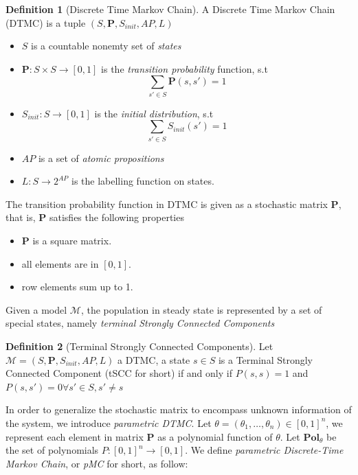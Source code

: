 \documentclass[12pt]{article}
\theoremstyle{definition}
\newtheorem{definition}{Definition}[section]
\begin{document}
\begin{definition}[Discrete Time Markov Chain]
  A Discrete Time Markov Chain (DTMC) is a tuple $(S,\mathbf{P}, S_{init}, AP,
  L)$
  \begin{itemize}
  \item $S$ is a countable nonemty set of \textit{states}
  \item $\mathbf{P}:S\times S \rightarrow [0,1]$ is the \textit{transition probability}
    function, s.t $$\sum_{s'\in S}\mathbf{P}(s, s') = 1$$
  \item $S_{init}: S \rightarrow [0,1]$ is the \textit{initial distribution},
    s.t  $$\sum_{s'\in S}S_{init}(s') = 1$$
  \item $AP$ is a set of \textit{atomic propositions}
  \item $L: S \rightarrow 2^{AP}$ is the labelling function on states.
  \end{itemize}
\end{definition}

The transition probability function in DTMC is given as a stochastic matrix $\mathbf{P}$,
that is, $\mathbf{P}$ satisfies the following properties
\begin{itemize}
\item $\mathbf{P}$ is a square matrix.
\item all elements are in $[0,1]$.
\item row elements sum up to 1.
\end{itemize}

Given a model $\mathcal{M}$, the population in steady state is represented by a
set of special states, namely \textit{terminal Strongly Connected Components}
\begin{definition}[Terminal Strongly Connected Components]
  Let $\mathcal{M}= (S,\mathbf{P}, S_{init}, AP, L)$ a DTMC, a state $s\in
  S$ is a Terminal Strongly Connected Component (tSCC for short) if and only if
  $P(s, s) = 1$ and $P(s, s') = 0 \forall s' \in S, s' \neq s$
\end{definition}

In order to generalize the stochastic matrix to encompass unknown information of
the system, we introduce \textit{parametric DTMC}. Let $\theta =
(\theta_1,\ldots,\theta_n) \in [0,1]^n$, we represent each element in matrix
$\mathbf{P}$ as a polynomial function of $\theta$. Let $\mathbf{Pol}_\theta$ be the
set of polynomials $P: [0,1]^n \rightarrow [0,1]$. We define
\textit{parametric Discrete-Time Markov Chain}, or \textit{pMC} for short, as
follow:
\end{document}
